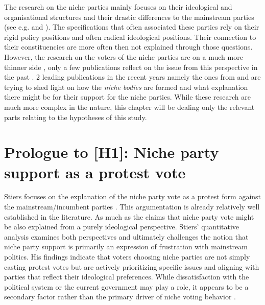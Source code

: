 The research on the niche parties mainly focuses on their ideological and
organisational structures and their drastic differences to the mainstream
parties (see e.g. \cite{adams2006} and \cite{meguid2005}). The specifications
that often associated these parties rely on their rigid policy positions and
often radical ideological positions. Their connection to their constituencies
are more often then not explained through those questions. However, the
research on the voters of the niche parties are on a much more thinner side
\parencite[2]{stiers2024}, only a few publications reflect on the issue from
this perspective in the past \parencite[26-27]{nonnemacher2023}. 2 leading publications in the recent years namely
the ones from \textcite{nonnemacher2023} and \textcite{stiers2024} are trying
to shed light on how the \emph{niche bodies} are formed and what explanation
there might be for their support for the niche parties. While these research
are much more complex in the nature, this chapter will be dealing only the
relevant parts relating to the hypotheses of this study.


\section{Prologue to [H1]: Niche party support as a protest vote}
Stiers \parencite*{stiers2024} focuses on the explanation of the niche party
vote as a protest form against the mainstream/incumbent parties \parencite[2]{stiers2024}. This argumentation is already relatively well established in the literature. As much as the claims that niche party vote might be also explained from a purely ideological perspective. Stiers’ quantitative analysis examines both perspectives and ultimately challenges the notion that niche party support is primarily an expression of frustration with mainstream politics. His findings indicate that voters choosing niche parties are not simply casting protest votes but are actively prioritizing specific issues and aligning with parties that reflect their ideological preferences. While dissatisfaction with the political system or the current government may play a role, it appears to be a secondary factor rather than the primary driver of niche voting behavior \parencite[see 6-9]{stiers2024}.

